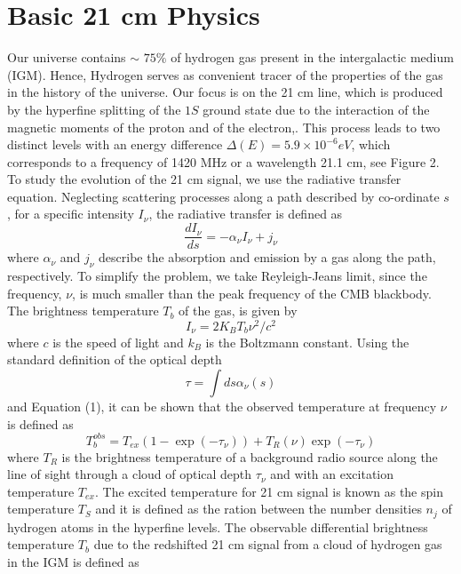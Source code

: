 \chapter{Basic 21 cm Physics}

\noindent
Our universe contains $\sim$ $75\%$ of hydrogen gas present in the intergalactic medium (IGM). Hence, Hydrogen serves as convenient tracer of the properties of the gas in the history of the universe. Our focus is on the 21 cm line, which is produced by the hyperfine splitting of the $1S$ ground state due to the interaction of the magnetic moments of the proton and of the  electron\cite{c},. This process leads to two distinct levels with an energy difference $\Delta(E)=5.9\times10^{-6} eV$, which  corresponds to a frequency of 1420 MHz or a wavelength 21.1 cm, see Figure 2.
To study the evolution of the 21 cm signal, we use the radiative transfer equation. Neglecting scattering processes along a path described by co-ordinate $s$ , for a specific intensity $I_{\nu}$, the radiative transfer is defined as \cite{c}
\begin{equation}
\frac{dI_{\nu}}{ds} =-\alpha_{\nu}I_{\nu}+j_{\nu}
\end{equation}
where $\alpha_{\nu}$ and $j_{\nu}$ describe the absorption and emission by a gas along the path, respectively. To simplify the problem, we take Reyleigh-Jeans limit, since the frequency, $\nu$, is much smaller than the peak frequency of the CMB blackbody. The brightness temperature $T_b$ of the gas, is given by\cite{c}
\begin{equation}
I_{\nu}=2K_{B}T_b\nu^2/c^2
\end{equation}
where $c$ is the speed of light and $k_{B}$ is the Boltzmann constant. Using the standard definition of the optical depth 
\begin{equation}
\tau = \int ds\alpha_{\nu}(s)
\end{equation}
and Equation (1), it can be shown that the observed temperature at frequency $\nu$ is defined as\cite{c}
\begin{equation}
T^{obs}_{b} =T_{ex}(1-\exp(-\tau_{\nu}))+ T_{R}(\nu)\exp(-\tau_{\nu})
\end{equation}
where $T_{R}$ is the brightness temperature of a background radio source along the line of sight through a cloud of optical depth $\tau_{\nu}$ and with an excitation temperature $T_{ex}$. The excited temperature for 21 cm signal is known as the spin temperature $T_S$ and it is defined as the ration between the number densities $n_j$ of hydrogen atoms in the hyperfine levels\citet{c}. The observable differential brightness temperature $T_b$ due to the redshifted 21 cm signal from a cloud of hydrogen gas in the IGM is defined as\citet{d}

